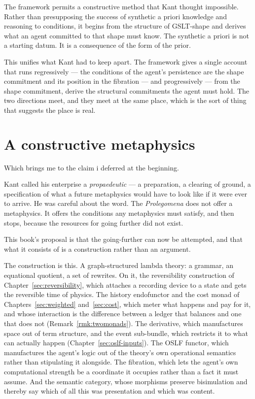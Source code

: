 The framework permits a constructive method that Kant thought
impossible.
Rather than presupposing the success of synthetic a priori
knowledge and reasoning to conditions, it begins from the structure
of GSLT-shape and derives what an agent committed to that shape
must know.
The synthetic a priori is not a starting datum.
It is a consequence of the form of the prior.

This unifies what Kant had to keep apart.
The framework gives a single account that runs regressively --- the
conditions of the agent's persistence are the shape commitment and
its position in the fibration --- and progressively --- from the
shape commitment, derive the structural commitments the agent must
hold.
The two directions meet, and they meet at the same place, which is
the sort of thing that suggests the place is real.

\section{A constructive metaphysics}
\label{sec:constructive-metaphysics}

Which brings me to the claim i deferred at the beginning.

Kant called his enterprise a \emph{propaedeutic} --- a
preparation, a clearing of ground, a specification of what a future
metaphysics would have to look like if it were ever to arrive.
He was careful about the word.
The \emph{Prolegomena} does not offer a metaphysics.
It offers the conditions any metaphysics must satisfy, and then
stops, because the resources for going further did not exist.

This book's proposal is that the going-further can now be
attempted, and that what it consists of is a construction rather
than an argument.

The construction is this.
A graph-structured lambda theory: a grammar, an equational
quotient, a set of rewrites.
On it, the reversibility construction of
Chapter~\ref{sec:reversibility}, which attaches a recording device
to a state and gets the reversible time of physics.
The history endofunctor and the cost monad of
Chapters~\ref{sec:weighted} and~\ref{sec:cost}, which meter what
happens and pay for it, and whose interaction is the difference
between a ledger that balances and one that
does not (Remark~\ref{rmk:twomonads}).
The derivative, which manufactures space out of term structure,
and the event sub-bundle, which restricts it to what can actually
happen (Chapter~\ref{sec:oslf-inputs}).
The OSLF functor, which manufactures the agent's logic out of the
theory's own operational semantics rather than stipulating it
alongside.
The fibration, which lets the agent's own computational strength be
a coordinate it occupies rather than a fact it must assume.
And the semantic category, whose morphisms preserve bisimulation
and thereby say which of all this was presentation and which was
content.

